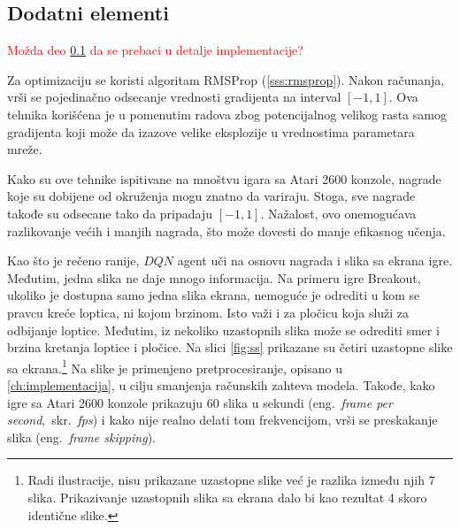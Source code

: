 \subsection{Dodatni elementi}
\label{ss:dod_el}
\textcolor{red}{Možda deo \ref{ss:dod_el} da se prebaci u detalje implementacije?}
\par 
Za optimizaciju se koristi algoritam RMSProp (\ref{sss:rmsprop}). Nakon računanja, vrši se pojedinačno odsecanje vrednosti gradijenta na interval $[-1, 1]$. Ova tehnika korišćena je u pomenutim radova zbog potencijalnog velikog rasta samog gradijenta koji može da izazove velike eksplozije u vrednostima parametara mreže.
\par 
Kako su ove tehnike ispitivane na mnoštvu igara sa Atari 2600 konzole, nagrade koje su dobijene od okruženja mogu znatno da variraju. Stoga, sve nagrade takođe su odsecane tako da pripadaju $[-1, 1]$. Nažalost, ovo onemogućava razlikovanje većih i manjih nagrada, što može dovesti do manje efikasnog učenja.
\par 
Kao što je rečeno ranije, $DQN$ agent uči na osnovu nagrada i slika sa ekrana igre. Međutim, jedna slika ne daje mnogo informacija. Na primeru igre Breakout, ukoliko je dostupna samo jedna slika ekrana, nemoguće je odrediti u kom se pravcu kreće loptica, ni kojom brzinom. Isto važi i za pločicu koja služi za odbijanje loptice. Međutim, iz nekoliko uzastopnih slika može se odrediti smer i brzina kretanja loptice i pločice. Na slici \ref{fig:ss} prikazane su četiri uzastopne slike sa ekrana.\footnote{Radi ilustracije, nisu prikazane uzastopne slike već je razlika između njih 7 slika. Prikazivanje uzastopnih slika sa ekrana dalo bi kao rezultat 4 skoro identične slike.} Na slike je primenjeno pretprocesiranje, opisano u \ref{ch:implementacija}, u cilju smanjenja računskih zahteva modela. Takođe, kako igre sa Atari 2600 konzole prikazuju $60$ slika u sekundi (eng.~{\em frame per second},~skr.~{\em fps}) i kako nije realno delati tom frekvencijom, vrši se preskakanje slika (eng.~{\em frame skipping}).

